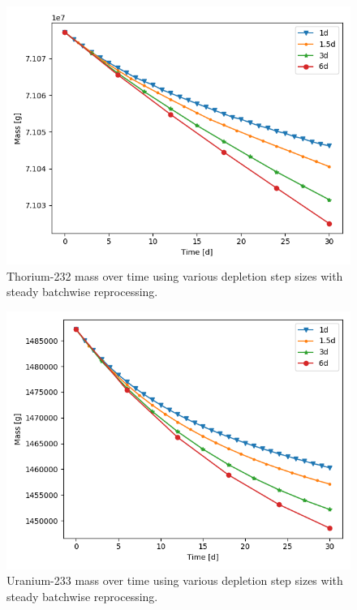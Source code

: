 \begin{figure}[H]
  \centering
  \includegraphics[scale=0.5]{images/Th232_sp_comp.png}
  \caption{Thorium-232 mass over time using various depletion step sizes with steady batchwise reprocessing.}
   \label{fig:steady-batch-th}
\end{figure}

\begin{figure}[H]
  \centering
  \includegraphics[scale=0.5]{images/U233_sp_comp.png}
  \caption{Uranium-233 mass over time using various depletion step sizes with steady batchwise reprocessing.}
   \label{fig:steady-batch-u}
\end{figure}

